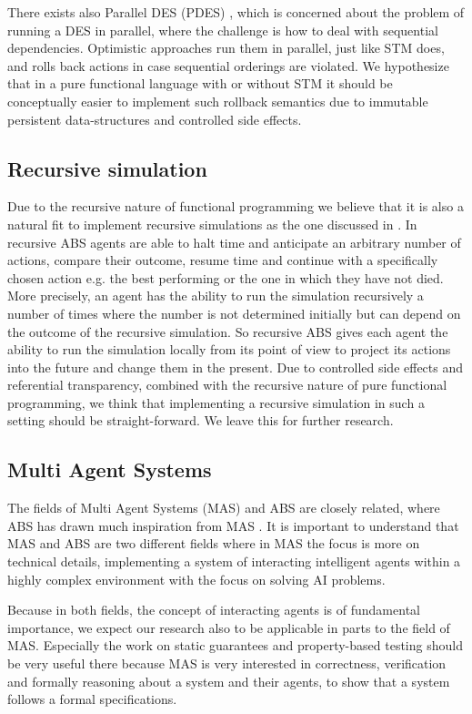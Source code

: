 There exists also Parallel DES (PDES) \cite{fujimoto_parallel_2017}, which is concerned about the problem of running a DES in parallel, where the challenge is how to deal with sequential dependencies. Optimistic approaches run them in parallel, just like STM does, and rolls back actions in case sequential orderings are violated. We hypothesize that in a pure functional language with or without STM it should be conceptually easier to implement such rollback semantics due to immutable persistent data-structures and controlled side effects.
 
\subsection{Recursive simulation}
Due to the recursive nature of functional programming we believe that it is also a natural fit to implement recursive simulations as the one discussed in \cite{gilmer_recursive_2000}. In recursive ABS agents are able to halt time and anticipate an arbitrary number of actions, compare their outcome, resume time and continue with a specifically chosen action e.g. the best performing or the one in which they have not died. More precisely, an agent has the ability to run the simulation recursively a number of times where the number is not determined initially but can depend on the outcome of the recursive simulation. So recursive ABS gives each agent the ability to run the simulation locally from its point of view to project its actions into the future and change them in the present. Due to controlled side effects and referential transparency, combined with the recursive nature of pure functional programming, we think that implementing a recursive simulation in such a setting should be straight-forward. We leave this for further research.

\subsection{Multi Agent Systems}
The fields of Multi Agent Systems (MAS) and ABS are closely related, where ABS has drawn much inspiration from MAS \cite{weiss_multiagent_2013,wooldridge_introduction_2009}. It is important to understand that MAS and ABS are two different fields where in MAS the focus is more on technical details, implementing a system of interacting intelligent agents within a highly complex environment with the focus on solving AI problems.

Because in both fields, the concept of interacting agents is of fundamental importance, we expect our research also to be applicable in parts to the field of MAS. Especially the work on static guarantees and property-based testing should be very useful there because MAS is very interested in correctness, verification and formally reasoning about a system and their agents, to show that a system follows a formal specifications.